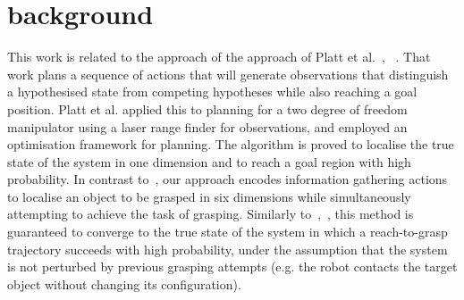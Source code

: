 \section{background}
\label{sec:background}

This work is related to the approach of the approach of Platt et al.~\citep{bib:platt_csail_2011}, ~\citep{bib:platt_icra_2012}. That work plans a sequence of actions that will generate observations that distinguish a hypothesised state from competing hypotheses while also reaching a goal position. Platt et al.  applied this to planning for a two degree of freedom manipulator using a laser range finder for observations, and employed an optimisation framework for planning. The algorithm is proved to localise the true state of the system in one dimension and to reach a goal region with high probability. In contrast to~\citep{bib:platt_csail_2011}, our approach encodes information gathering actions to localise an object to be grasped in six dimensions while simultaneously attempting to achieve the task of grasping.  Similarly to~\citep{bib:platt_csail_2011},~\citep{bib:platt_icra_2012}, this method is guaranteed to converge to the true state of the system in which a reach-to-grasp trajectory succeeds with high probability, under the assumption that the system is not perturbed by previous grasping attempts (e.g. the robot contacts the target object without changing its configuration). 
